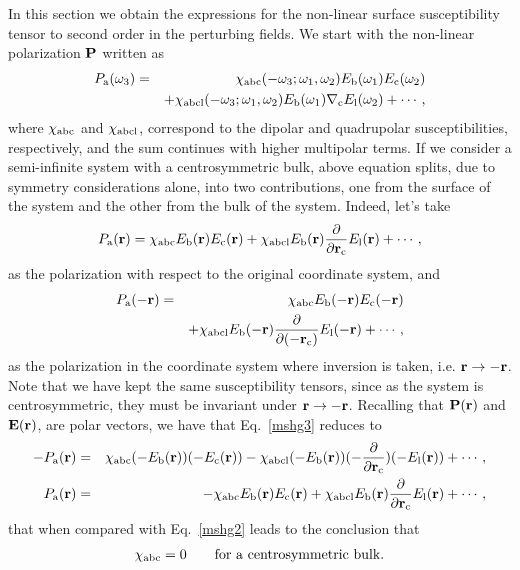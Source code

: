 \documentclass[floatfix,prb,aps,superscriptaddress,11pt,preprint]{revtex4}
\begin{document}
In this section we obtain the expressions for the non-linear
surface susceptibility tensor to second order in the perturbing fields.
We start with the 
non-linear polarization $\mathbf{P}$ written as
\begin{eqnarray}\label{mshg}
P_{\mathrm{a}}(\omega_3)&=&\chi_{\mathrm{a}\mathrm{b}\mathrm{c}}(-\omega_3;\omega_1,\omega_2)
E_{\mathrm{b}}(\omega_1)
E_{\mathrm{c}}(\omega_2)
\nonumber \\
&&+
\chi_{\mathrm{a}\mathrm{b}\mathrm{c}\mathrm{l}}(-\omega_3;\omega_1,\omega_2)
E_{\mathrm{b}}(\omega_1)\nabla_{\mathrm{c}} E_{\mathrm{l}}(\omega_2)
+\cdots,
\end{eqnarray}
where $\chi_{\mathrm{a}\mathrm{b}\mathrm{c}}$ and $\chi_{\mathrm{a}\mathrm{b}\mathrm{c}\mathrm{l}}$,
correspond to the dipolar and quadrupolar susceptibilities,
respectively,
and the sum continues
with higher multipolar terms.
If we consider a semi-infinite system with a centrosymmetric bulk,
above equation splits, due to symmetry considerations alone, into two
contributions, one from the surface of the system and the other from
the bulk of the system. Indeed, let's take
\begin{equation}\label{mshg2}
P_{\mathrm{a}}(\mathbf{r})=\chi_{\mathrm{a}\mathrm{b}\mathrm{c}}E_{\mathrm{b}}(\mathbf{r})E_{\mathrm{c}}(\mathbf{r})
+
\chi_{\mathrm{a}\mathrm{b}\mathrm{c}\mathrm{l}}E_{\mathrm{b}}(\mathbf{r})\frac{\partial}{\partial
  \mathbf{r}_{\mathrm{c}}} E_{\mathrm{l}}(\mathbf{r}) 
+\cdots,
\end{equation}
as the polarization with respect to the original coordinate system, and 
\begin{eqnarray}\label{mshg3}
P_{\mathrm{a}}(-\mathbf{r})&=&\chi_{\mathrm{a}\mathrm{b}\mathrm{c}}E_{\mathrm{b}}(-\mathbf{r})E_{\mathrm{c}}(-\mathbf{r})
\nonumber \\
&&+
\chi_{\mathrm{a}\mathrm{b}\mathrm{c}\mathrm{l}}E_{\mathrm{b}}(-\mathbf{r})\frac{\partial}{\partial(-
  \mathbf{r}_{\mathrm{c}})} E_{\mathrm{l}}(-\mathbf{r}) 
+\cdots, 
\end{eqnarray}
as the polarization in the coordinate system where inversion is taken,
i.e. $\mathbf{r} \to -\mathbf{r}$. 
Note that we have kept the same susceptibility tensors, since as the
system is centrosymmetric, they must be invariant under $\mathbf{r} \to
-\mathbf{r}$. 
Recalling that $\mathbf{P}(\mathbf{r})$ and
$\mathbf{E}(\mathbf{r})$, are polar vectors,\cite{Jackson75} we have that
Eq.~\eqref{mshg3} reduces to
\begin{eqnarray}\label{mshg4}
-P_{\mathrm{a}}(\mathbf{r})&=&\chi_{\mathrm{a}\mathrm{b}\mathrm{c}}(-E_{\mathrm{b}}(\mathbf{r}))(-E_{\mathrm{c}}(\mathbf{r}))
-
\chi_{\mathrm{a}\mathrm{b}\mathrm{c}\mathrm{l}}(-E_{\mathrm{b}}(\mathbf{r}))(-\frac{\partial}{\partial\mathbf{r}_{\mathrm{c}}})(-
E_{\mathrm{l}}(\mathbf{r})) 
+\cdots,
\nonumber \\
P_{\mathrm{a}}(\mathbf{r})&=&-\chi_{\mathrm{a}\mathrm{b}\mathrm{c}}E_{\mathrm{b}}(\mathbf{r})E_{\mathrm{c}}(\mathbf{r})
+
\chi_{\mathrm{a}\mathrm{b}\mathrm{c}\mathrm{l}}E_{\mathrm{b}}(\mathbf{r})\frac{\partial}{\partial\mathbf{r}_{\mathrm{c}}}
E_{\mathrm{l}}(\mathbf{r}) 
+\cdots,
\end{eqnarray}
that when compared with Eq.~\eqref{mshg2}
leads to the conclusion that
\begin{equation}\label{sshg}
\chi_{\mathrm{a}\mathrm{b}\mathrm{c}}=0 \quad\quad\mbox{for a centrosymmetric bulk}.
\end{equation}
\end{document}

